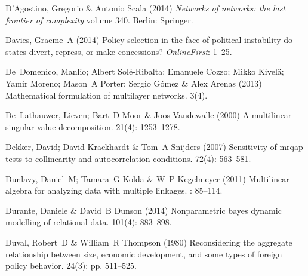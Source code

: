\documentclass[3p,times,twocolumn,authoryear,12pt]{elsarticle}
\begin{document}
\begin{thebibliography}{}
D'Agostino, Gregorio  \& Antonio Scala (2014) {\em Networks of networks: the
  last frontier of complexity} volume 340.
\newblock Berlin: Springer.

Davies, Graeme~A (2014) Policy selection in the face of political instability
  do states divert, repress, or make concessions?
 {\em OnlineFirst}: 1--25.

De~Domenico, Manlio; Albert Sol{\'e}-Ribalta; Emanuele Cozzo; Mikko Kivel{\"a};
  Yamir Moreno; Mason~A Porter; Sergio G{\'o}mez  \& Alex Arenas (2013)
  Mathematical formulation of multilayer networks.
 { 3\/}(4).

De~Lathauwer, Lieven; Bart~D Moor  \& Joos Vandewalle (2000) A multilinear
  singular value decomposition.
 { 21\/}(4):
  1253--1278.

Dekker, David; David Krackhardt  \& Tom~A Snijders (2007) Sensitivity of mrqap
  tests to collinearity and autocorrelation conditions.
 { 72\/}(4): 563--581.

Dunlavy, Daniel~M; Tamara~G Kolda  \& W~P Kegelmeyer (2011) Multilinear algebra
  for analyzing data with multiple linkages.
:
  85--114.

Durante, Daniele  \& David~B Dunson (2014) Nonparametric bayes dynamic
  modelling of relational data.
 { 101\/}(4): 883--898.

Duval, Robert~D  \& William~R Thompson (1980) Reconsidering the aggregate
  relationship between size, economic development, and some types of foreign
  policy behavior.
 { 24\/}(3): pp. 511--525.


\end{thebibliography}
\end{document}
